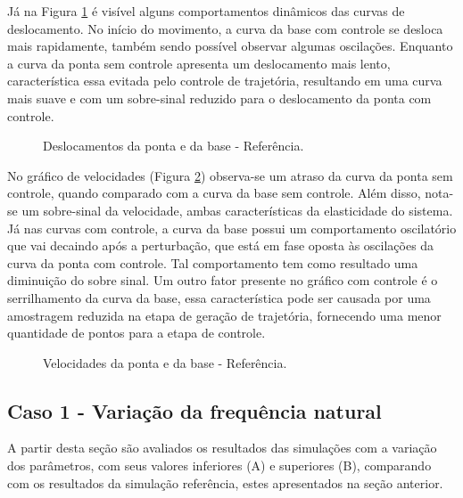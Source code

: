 Já na Figura \ref{fig:ref_des} é visível alguns comportamentos dinâmicos das curvas de deslocamento. No início do movimento, a curva da base com controle se desloca mais rapidamente, também sendo possível observar algumas oscilações. Enquanto a curva da ponta sem controle apresenta um deslocamento mais lento, característica essa evitada pelo controle de trajetória, resultando em uma curva mais suave e com um sobre-sinal reduzido para o deslocamento da ponta com controle.

\begin{figure}[H]
    \centering
    \hfill
    \caption{Deslocamentos da ponta e da base - Referência.}
    \label{fig:ref_des}
\end{figure}

No gráfico de velocidades (Figura \ref{fig:ref_vel}) observa-se um atraso da curva da ponta sem controle, quando comparado com a curva da base sem controle. Além disso, nota-se um sobre-sinal da velocidade, ambas características da elasticidade do sistema.
Já nas curvas com controle, a curva da base possui um comportamento oscilatório que vai decaindo após a perturbação, que está em fase oposta às oscilações da curva da ponta com controle. Tal comportamento tem como resultado uma diminuição do sobre sinal. Um outro fator presente no gráfico com controle é o serrilhamento da curva da base, essa característica pode ser causada por uma amostragem reduzida na etapa de geração de trajetória, fornecendo uma menor quantidade de pontos para a etapa de controle.

\begin{figure}[H]
    \centering
    \hfill
    \caption{Velocidades da ponta e da base - Referência.}
    \label{fig:ref_vel}
\end{figure}


\subsection{Caso 1 - Variação da frequência natural}
A partir desta seção são avaliados os resultados das simulações com a variação dos parâmetros, com seus valores inferiores (A) e superiores (B), comparando com os resultados da simulação referência, estes apresentados na seção anterior.

